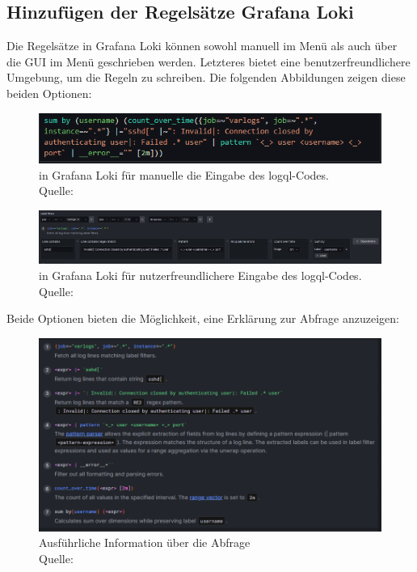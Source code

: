 \subsection{Hinzufügen der Regelsätze Grafana Loki}

Die Regelsätze in Grafana Loki können sowohl manuell im Menü  als auch über die \gls{GUI} im Menü  geschrieben werden. Letzteres bietet eine benutzerfreundlichere Umgebung, um die Regeln zu schreiben. Die folgenden Abbildungen zeigen diese beiden Optionen:

\begin{figure}[H]
   \centering
   \includegraphics[width=1\textwidth]{assets/manuellerCodeLoki.png}
   \caption[ in Grafana Loki für manuelle die Eingabe des \gls{logql}-Codes]
   { in Grafana Loki für manuelle die Eingabe des \gls{logql}-Codes. \\ Quelle: \citep{VoidQuark_sshlogs}}
   \centering
\end{figure}

\begin{figure}[H]
   \centering
   \includegraphics[width=1\textwidth]{assets/klickibuntyGrafana.png}
   \caption[ in Grafana Loki für nutzerfreundlichere Eingabe des \gls{logql}-Codes.]
   { in Grafana Loki für nutzerfreundlichere Eingabe des \gls{logql}-Codes. Quelle: \citep{VoidQuark_sshlogs}}
   \centering
\end{figure}

Beide Optionen bieten die Möglichkeit, eine Erklärung zur Abfrage anzuzeigen:
\begin{figure}[H]
   \centering
   \includegraphics[width=1\textwidth]{assets/erklaerungLoki.png}
   \caption[Ausführliche Information über die Abfrage]
   {Ausführliche Information über die Abfrage\\Quelle: \citep{Grafana_QueryEditor}}
   \centering
\end{figure}


